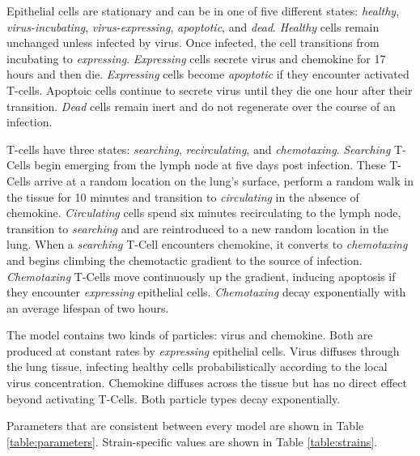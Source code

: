 \documentclass[10pt]{article}
\begin{document}
Epithelial cells are stationary and can be in one of five different states: \emph{healthy}, \emph{virus-incubating}, \emph{virus-expressing}, \emph{apoptotic}, and \emph{dead}. \emph{Healthy} cells remain unchanged unless infected by virus. Once infected, the cell transitions from {incubating} to \emph{expressing}. \emph{Expressing} cells secrete virus and chemokine for 17 hours and then die. \emph{Expressing} cells become \emph{apoptotic} if they encounter activated T-cells. Apoptoic cells continue to secrete virus until they die one hour after their transition. \emph{Dead} cells remain inert and do not regenerate over the course of an infection.

T-cells have three states: \emph{searching}, \emph{recirculating}, and \emph{chemotaxing}. \emph{Searching} T-Cells begin emerging from the lymph node at five days post infection. These T-Cells arrive at a random location on the lung's surface, perform a random walk in the tissue for 10 minutes and transition to \emph{circulating} in the absence of chemokine. \emph{Circulating} cells spend six minutes recirculating to the lymph node, transition to \emph{searching} and are reintroduced to a new random location in the lung. When a \emph{searching} T-Cell encounters chemokine, it converts to \emph{chemotaxing} and begins climbing the chemotactic gradient to the source of infection. \emph{Chemotaxing} T-Cells move continuously up the gradient, inducing apoptosis if they encounter \emph{expressing} epithelial cells. \emph{Chemotaxing} decay exponentially with an average lifespan of two hours. 

The model contains two kinds of particles: virus and chemokine. Both are produced at constant rates by \emph{expressing} epithelial cells.  Virus diffuses through the lung tissue, infecting healthy cells probabilistically according to the local virus concentration. Chemokine diffuses across the tissue but has no
direct effect beyond activating T-Cells. Both particle types decay exponentially.

Parameters that are consistent between every model are shown in Table \ref{table:parameters}.  Strain-specific values are shown in Table \ref{table:strains}.
\end{document}
